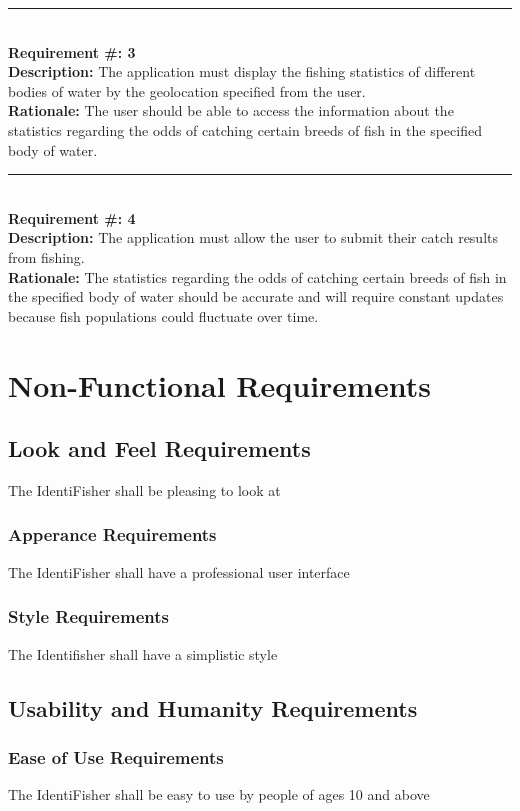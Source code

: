 \documentclass{article}
\begin{document}
	\noindent\rule{12cm}{0.4pt} \\

	\noindent\textbf{Requirement \#: 3}\\
	\textbf{Description:} The application must display the fishing statistics of different bodies of water by the geolocation specified from the user.\\
	\textbf{Rationale:} The user should be able to access the information about the statistics regarding the odds of catching certain breeds of fish in the specified body of water. \\

	\noindent\rule{12cm}{0.4pt} \\

	\noindent\textbf{Requirement \#: 4}\\
	\textbf{Description:} The application must allow the user to submit their catch results from fishing.\\
	\textbf{Rationale:} The statistics regarding the odds of catching certain breeds of fish in the specified body of water should be accurate and will require constant updates because fish populations could fluctuate over time. \\


\section{Non-Functional Requirements}

\subsection{Look and Feel Requirements}
The IdentiFisher shall be pleasing to look at
\subsubsection{Apperance Requirements}
The IdentiFisher shall have a professional user interface
\subsubsection{Style Requirements}
The Identifisher shall have a simplistic style

\subsection{Usability and Humanity Requirements}
\subsubsection{Ease of Use Requirements}
The IdentiFisher shall be easy to use by people of ages 10 and above
\end{document}
